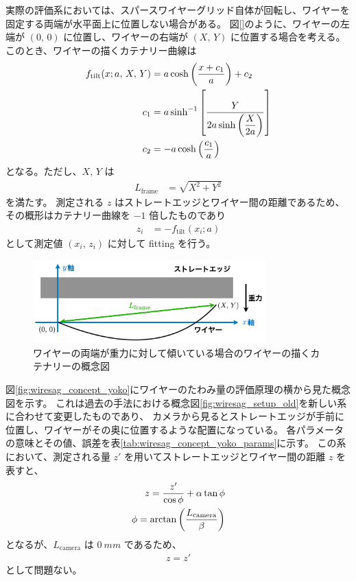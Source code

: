 \documentclass[../../main.tex]{subfiles}
\begin{document}
実際の評価系においては、スパースワイヤーグリッド自体が回転し、ワイヤーを固定する両端が水平面上に位置しない場合がある。
図\ref{}のように、ワイヤーの左端が $(0,\,0)$ に位置し、ワイヤーの右端が $(X,\,Y)$ に位置する場合を考える。
このとき、ワイヤーの描くカテナリー曲線は
\begin{align}
    f_{\mathrm{tilt}}(x;a,\,X,\,Y) &= a\cosh\qty(\dfrac{x+c_1}{a}) + c_2 \\
    c_1 &= a\sinh^{-1}\qty[\dfrac{Y}{2a\sinh\qty(\dfrac{X}{2a})}] \\
    c_2 &= -a\cosh\qty(\dfrac{c_1}{a})
\end{align}
となる。ただし、$X,\,Y$ は
\begin{align}
    L_{\mathrm{frame}} &= \sqrt{X^2+Y^2}
\end{align}
を満たす。
測定される $z$ はストレートエッジとワイヤー間の距離であるため、その概形はカテナリー曲線を $-1$ 倍したものであり
\begin{align}
    z_{i} &= -f_{\mathrm{tilt}}(x_{i};a)
\end{align}
として測定値 $(x_{i},\,z_{i})$ に対して fitting を行う。
\begin{figure}[H]
    \centering
    \includegraphics[width=0.8\textwidth]{wiresag/wire_catenary_tilt.pdf}
    \caption{ワイヤーの両端が重力に対して傾いている場合のワイヤーの描くカテナリーの概念図}
    \label{fig:wiresag_concept_tilt}
\end{figure}

図\ref{fig:wiresag_concept_yoko}にワイヤーのたわみ量の評価原理の横から見た概念図を示す。
これは過去の手法における概念図\ref{fig:wiresag_setup_old}を新しい系に合わせて変更したものであり、
カメラから見るとストレートエッジが手前に位置し、ワイヤーがその奥に位置するような配置になっている。
各パラメータの意味とその値、誤差を表\ref{tab:wiresag_concept_yoko_params}に示す。
この系において、測定される量 $z'$ を用いてストレートエッジとワイヤー間の距離 $z$ を表すと、
\begin{align}
    z = \dfrac{z'}{\cos\phi} + \alpha\tan\phi \\
    \phi = \arctan\qty(\dfrac{L_{\mathrm{camera}}}{\beta})
\end{align}
となるが、$L_{\mathrm{camera}}$ は $\SI{0}{mm}$ であるため、
\begin{align}
    z = z'
\end{align}
として問題ない。
\end{document}
